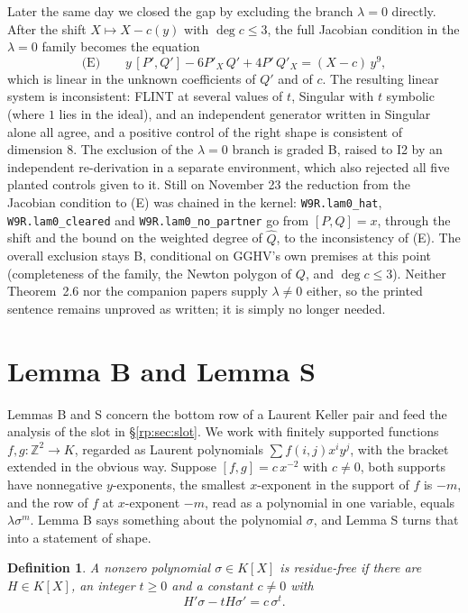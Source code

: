 \documentclass[a4paper,11pt]{article}
\theoremstyle{jsplain}
\theoremstyle{jsdef}
\newtheorem{definition}[theorem]{Definition}
\theoremstyle{jsrem}
\begin{document}
Later the same day we closed the gap by excluding the branch $\lambda=0$ directly. After the shift $X\mapsto X-c(y)$ with $\deg c\le3$, the full Jacobian condition in the $\lambda=0$ family becomes the equation
\[
\text{(E)}\qquad y\,[P',Q']-6P'_X\,Q'+4P'\,Q'_X=(X-c)\,y^9 ,
\]
which is linear in the unknown coefficients of $Q'$ and of $c$. The resulting linear system is inconsistent: FLINT at several values of $t$, Singular with $t$ symbolic (where $1$ lies in the ideal), and an independent generator written in Singular alone all agree, and a positive control of the right shape is consistent of dimension $8$. The exclusion of the $\lambda=0$ branch is graded B, raised to I2 by an independent re-derivation in a separate environment, which also rejected all five planted controls given to it. Still on November 23 the reduction from the Jacobian condition to (E) was chained in the kernel: \texttt{W9R.\allowbreak{}lam0\_\allowbreak{}hat}, \texttt{W9R.\allowbreak{}lam0\_\allowbreak{}cleared} and \texttt{W9R.\allowbreak{}lam0\_\allowbreak{}no\_\allowbreak{}partner} go from $[P,Q]=x$, through the shift and the bound on the weighted degree of $\hat Q$, to the inconsistency of (E). The overall exclusion stays B, conditional on GGHV's own premises at this point (completeness of the family, the Newton polygon of $Q$, and $\deg c\le3$). Neither~\cite{GGV1} Theorem~2.6 nor the companion papers supply $\lambda\ne0$ either, so the printed sentence remains unproved as written; it is simply no longer needed.

\section{Lemma B and Lemma S}\label{rp:sec:lemmaB}

Lemmas B and S concern the bottom row of a Laurent Keller pair and feed the analysis of the slot in \S\ref{rp:sec:slot}. We work with finitely supported functions $f,g:\mathbb Z^2\to K$, regarded as Laurent polynomials $\sum f(i,j)x^iy^j$, with the bracket extended in the obvious way. Suppose $[f,g]=c\,x^{-2}$ with $c\ne0$, both supports have nonnegative $y$-exponents, the smallest $x$-exponent in the support of $f$ is $-m$, and the row of $f$ at $x$-exponent $-m$, read as a polynomial in one variable, equals $\lambda\sigma^m$. Lemma B says something about the polynomial $\sigma$, and Lemma S turns that into a statement of shape.

\begin{definition}\label{rp:def:rf}
A nonzero polynomial $\sigma\in K[X]$ is \emph{residue-free} if there are $H\in K[X]$, an integer $t\ge0$ and a constant $c\ne0$ with
\[
H'\sigma-tH\sigma'=c\,\sigma^t .
\]
\end{definition}
\end{document}
